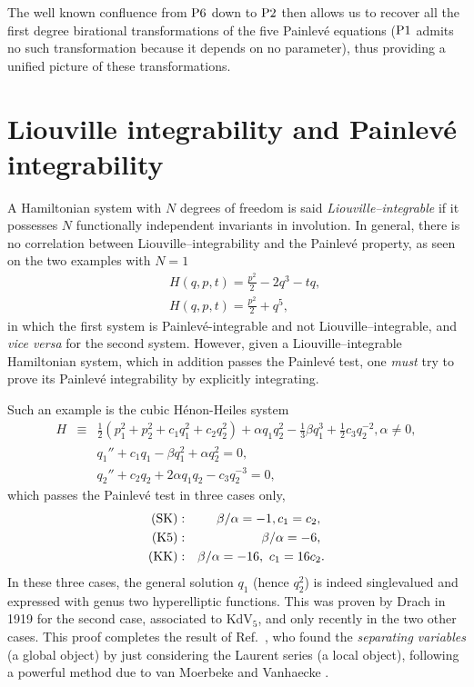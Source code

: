 \documentclass[10pt]{article}
\begin{document}
The well known confluence from ${\rm P6}$ down to ${\rm P2}$
then allows us to recover \cite{CM2001c} all the first degree
birational transformations of the five Painlev\'e equations
(${\rm P1}$ admits no such transformation because it depends on no parameter),
thus providing a unified picture of these transformations.

\section{Liouville integrability and Painlev\'e integrability}

A Hamiltonian system with $N$ degrees of freedom is said
\textit{Liouville--integrable}
if it possesses $N$ functionally independent invariants in involution.
In general, there is no correlation between 
Liouville--integrability and the Painlev\'e property,
as seen on the two examples with $N=1$
\begin{eqnarray}
& &
H(q,p,t)=\frac{p^2}{2} - 2 q^3 - t q,\
\\
& &
H(q,p,t)=\frac{p^2}{2} + q^5,
\end{eqnarray}
in which 
the first system is Painlev\'e-integrable and not Liouville--integrable,
and \textit{vice versa} for the second system.
However,
given a Liouville--integrable Hamiltonian system,
which in addition passes the Painlev\'e test,
one \textit{must} try to prove its Painlev\'e integrability
by explicitly integrating.

Such an example is the cubic H\'enon-Heiles system
\begin{eqnarray}
H
& \equiv & 
 \frac{1}{2} (p_1^2 + p_2^2 + c_1 q_1^2 + c_2 q_2^2)
    + \alpha q_1 q_2^2 - \frac{1}{3} \beta q_1^3 + \frac{1}{2} c_3 q_2^{-2},
\alpha \not=0,
\\
& & q_1'' + c_1 q_1 - \beta q_1^2 + \alpha q_2^2 = 0,
\label{eqHH1}
\\
& & q_2'' + c_2 q_2 + 2 \alpha q_1 q_2 - c_3 q_2^{-3} 
=0,
\label{eqHH2}
\end{eqnarray}
which passes the Painlev\'e test in three cases only,
\begin{eqnarray}
\hbox{(SK)} : & & 
\beta/ \alpha=-1,
c_1=c_2,\
\\
\hbox{(K5)} : & & 
\beta/ \alpha=-6,\
\\
\hbox{(KK)} : & & 
\beta/ \alpha=-16,\
c_1=16 c_2.
\end{eqnarray}
In these three cases, the general solution $q_1$ (hence $q_2^2$)
is indeed singlevalued and expressed with genus two hyperelliptic
functions.
This was proven by Drach in 1919 for the second case,
associated to KdV${}_5$,
and only recently 
\cite{VMC2002a}
in the two other cases.
This proof completes the result of Ref.~\cite{RGC},
who found 
the \textit{separating variables} (a global object)
by just considering the Laurent series (a local object),
following a powerful method due to van Moerbeke and Vanhaecke
\cite{VanhaeckeLNM}.
 \index{separating variables}
\end{document}
